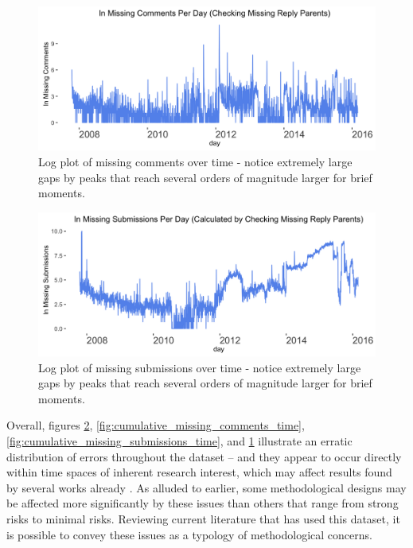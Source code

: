 \documentclass[letterpaper,12pt]{article}
\begin{document}
\begin{figure}[h]
  \centering
  \includegraphics[width=\textwidth]{log_missing_comments_time}
  \caption{Log plot of missing comments over time - notice extremely large gaps by peaks that reach several orders of magnitude larger for brief moments.}
  \label{fig:log_missing_comments_time}
\end{figure}

\begin{figure}[h]
  \centering
  \includegraphics[width=\textwidth]{log_missing_submissions_time}
  \caption{Log plot of missing submissions over time - notice extremely large gaps by peaks that reach several orders of magnitude larger for brief moments.}
  \label{fig:log_missing_submissions_time}
\end{figure}

Overall, figures \ref{fig:log_missing_submissions_time}, \ref{fig:cumulative_missing_comments_time}, \ref{fig:cumulative_missing_submissions_time}, and \ref{fig:log_missing_comments_time} illustrate an erratic distribution of errors throughout the dataset -- and they appear to occur directly within time spaces of inherent research interest, which may affect results found by several works already \cite{matias2016going,newell2016user}. As alluded to earlier, some methodological designs may be affected more significantly by these issues than others that range from strong risks to minimal risks. Reviewing current literature that has used this dataset, it is possible to convey these issues as a typology of methodological concerns.
\end{document}
